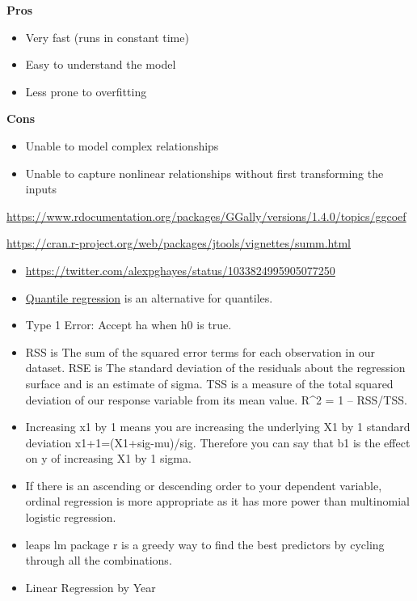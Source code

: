 \documentclass[]{book}
\begin{document}
\textbf{Pros}

\begin{itemize}
\item
  Very fast (runs in constant time)
\item
  Easy to understand the model
\item
  Less prone to overfitting
\end{itemize}

\textbf{Cons}

\begin{itemize}
\item
  Unable to model complex relationships
\item
  Unable to capture nonlinear relationships without first transforming
  the inputs
\end{itemize}

\url{https://www.rdocumentation.org/packages/GGally/versions/1.4.0/topics/ggcoef}

\url{https://cran.r-project.org/web/packages/jtools/vignettes/summ.html}

\begin{itemize}
\item
  \url{https://twitter.com/alexpghayes/status/1033824995905077250}
\item
  \href{https://en.wikipedia.org/wiki/Quantile_regression}{Quantile
  regression} is an alternative for quantiles.
\item
  Type 1 Error: Accept ha when h0 is true.
\item
  RSS is The sum of the squared error terms for each observation in our
  dataset. RSE is The standard deviation of the residuals about the
  regression surface and is an estimate of sigma. TSS is a measure of
  the total squared deviation of our response variable from its mean
  value. R\^{}2 = 1 -- RSS/TSS.
\item
  Increasing x1 by 1 means you are increasing the underlying X1 by 1
  standard deviation x1+1=(X1+sig-mu)/sig. Therefore you can say that b1
  is the effect on y of increasing X1 by 1 sigma.
\item
  If there is an ascending or descending order to your dependent
  variable, ordinal regression is more appropriate as it has more power
  than multinomial logistic regression.
\item
  leaps lm package r is a greedy way to find the best predictors by
  cycling through all the combinations.
\item
  Linear Regression by Year
\end{itemize}
\end{document}
